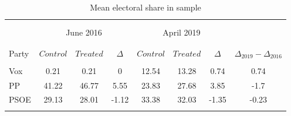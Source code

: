 \begin{table}[!htbp] \centering
\caption{Mean electoral share in sample}
\label{tab:did_deco}
\small
\begin{tabular}{lccccccc}
\\[-1.8ex]\hline
\hline \\[-1.8ex]
\\[-1.8ex]
& \multicolumn{3}{c}{June 2016} & \multicolumn{3}{c}{April 2019} & \\\\[-1.8]
\cline{2-7}\\[-1.8ex]
Party & $Control$ & $Treated$ & $\Delta$ & $Control$ & $Treated$ & $\Delta$ & $\Delta_{2019} - \Delta_{2016}$ \\
\hline \\[-1.8ex]
Vox & 0.21 & 0.21 & 0 & 12.54 & 13.28 & 0.74 & 0.74 \\
PP & 41.22 & 46.77 & 5.55 & 23.83 & 27.68 & 3.85 & -1.7 \\
PSOE & 29.13 & 28.01 & -1.12 & 33.38 & 32.03 & -1.35 & -0.23 \\
\hline
\hline \\[-1.8ex]
\end{tabular}
\end{table}

